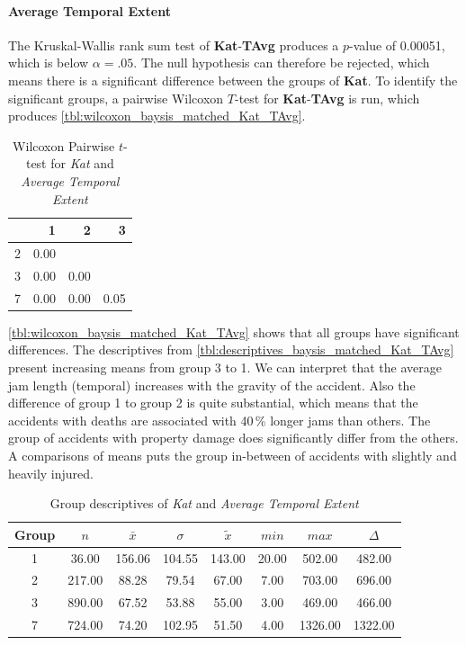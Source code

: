 \paragraph{Average Temporal Extent}
The Kruskal-Wallis rank sum test of \textbf{Kat}-\textbf{TAvg} produces a $p$-value of 0.00051, which is below $\alpha=.05$. The null hypothesis can therefore be rejected, which means there is a significant difference between the groups of \textbf{Kat}. To identify the significant groups, a pairwise Wilcoxon $T$-test for \textbf{Kat}-\textbf{TAvg} is run, which produces \autoref{tbl:wilcoxon_baysis_matched_Kat_TAvg}.
\begin{table}[ht]
	\small
	\centering
	\begin{tabular}{rrrr}
	  	\toprule
	 	& 1 & 2 & 3 \\ 
	  	\midrule
		2 & 0.00 &  &  \\ 
	  	3 & 0.00 & 0.00 &  \\ 
	  	7 & 0.00 & 0.00 & 0.05 \\ 
	   	\bottomrule
	\end{tabular}
	\caption{Wilcoxon Pairwise $t$-test for \textit{Kat} and \textit{Average Temporal Extent}}
	\label{tbl:wilcoxon_baysis_matched_Kat_TAvg}
\end{table}
\autoref{tbl:wilcoxon_baysis_matched_Kat_TAvg} shows that all groups have significant differences. The descriptives from \autoref{tbl:descriptives_baysis_matched_Kat_TAvg} present increasing means from group 3 to 1.	We can interpret that the average jam length (temporal) increases with the gravity of the accident. Also the difference of group 1 to group 2 is quite substantial, which means that the accidents with deaths are associated with 40\,\% longer jams than others. The group of accidents with property damage does significantly differ from the others. A comparisons of means puts the group in-between of accidents with slightly and heavily injured.
\begin{table}[ht]
	\small
	\centering
	\begin{tabular}{c|c|c|c|c|c|c|c}
	  	\toprule
		Group & $n$ & $\bar{x}$ & $\sigma$ & $\tilde{x}$ & $min$ & $max$ & $\Delta$ \\ 
	  	\midrule
		1 &  36.00 & 156.06 & 104.55 & 143.00 & 20.00 & 502.00 & 482.00 \\ 
	  	2 & 217.00 & 88.28 & 79.54 & 67.00 & 7.00 & 703.00 & 696.00 \\ 
	  	3 & 890.00 & 67.52 & 53.88 & 55.00 & 3.00 & 469.00 & 466.00 \\ 
	  	7 & 724.00 & 74.20 & 102.95 & 51.50 & 4.00 & 1326.00 & 1322.00 \\ 
	   	\bottomrule
	\end{tabular}
	\caption{Group descriptives of \textit{Kat} and \textit{Average Temporal Extent}}
	\label{tbl:descriptives_baysis_matched_Kat_TAvg}
\end{table}


